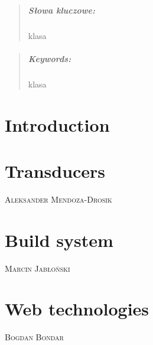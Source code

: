 \documentclass[oneside,english,logo]{amuthesis}
\author{Bohdan Bondar, Marcin Jałoński, Aleksander Mendoza-Drosik}
\date{Poznań, February 2021}
\makeatletter
\newcommand{\chapterauthor}[1]{%
	{\centering\vspace*{-25pt}%
		\linespread{1.1}\large\scshape#1%
		\par\nobreak\vspace*{35pt}}
	\@afterheading%
}
\makeatother
\begin{document}
	
	\maketitle
	\makestatement
	
	\begin{abstract}
		
		
		
		\paragraph{Słowa kluczowe:} klasa
	\end{abstract}
	
	\begin{abstract}
		\lipsum[2]
		
		\paragraph{Keywords:} klasa
	\end{abstract}
	
	
	
	\tableofcontents
	
	
	\chapter{Introduction}
	
	
	
	\chapter{Transducers}
	\chapterauthor{Aleksander Mendoza-Drosik}
	
	
	\chapter{Build system}
	\chapterauthor{Marcin Jabłoński}	
	
	
	\chapter{Web technologies}
	\chapterauthor{Bogdan Bondar}	
	
	
	
	
\end{document}

